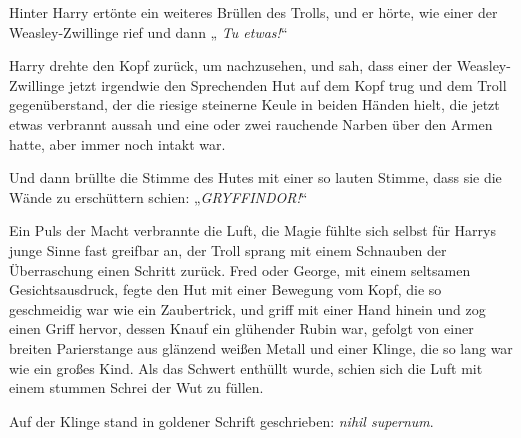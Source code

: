 Hinter Harry ertönte ein weiteres Brüllen des Trolls, und er hörte, wie einer der Weasley-Zwillinge  rief und dann „\emph{ Tu etwas!}“

Harry drehte den Kopf zurück, um nachzusehen, und sah, dass einer der Weasley-Zwillinge jetzt irgendwie den Sprechenden Hut auf dem Kopf trug und dem Troll gegenüberstand, der die riesige steinerne Keule in beiden Händen hielt, die jetzt etwas verbrannt aussah und eine oder zwei rauchende Narben über den Armen hatte, aber immer noch intakt war.

Und dann brüllte die Stimme des Hutes mit einer so lauten Stimme, dass sie die Wände zu erschüttern schien: „\emph{GRYFFINDOR!}“

Ein Puls der Macht verbrannte die Luft, die Magie fühlte sich selbst für Harrys junge Sinne fast greifbar an, der Troll sprang mit einem Schnauben der Überraschung einen Schritt zurück. Fred oder George, mit einem seltsamen Gesichtsausdruck, fegte den Hut mit einer Bewegung vom Kopf, die so geschmeidig war wie ein Zaubertrick, und griff mit einer Hand hinein und zog einen Griff hervor, dessen Knauf ein glühender Rubin war, gefolgt von einer breiten Parierstange aus glänzend weißen Metall und einer Klinge, die so lang war wie ein großes Kind. Als das Schwert enthüllt wurde, schien sich die Luft mit einem stummen Schrei der Wut zu füllen.

Auf der Klinge stand in goldener Schrift geschrieben: \emph{nihil supernum}.

